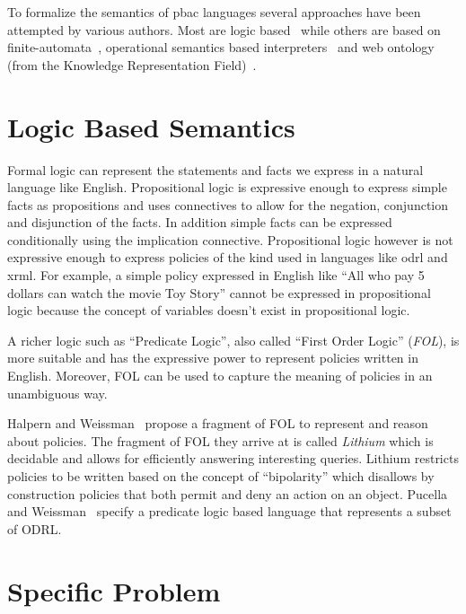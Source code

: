 To formalize the semantics of \ac{pbac} languages several approaches have been attempted by various authors. Most are logic based~\cite{Halpern2008, pucella2006} while others are based on finite-automata~\cite{Holzer}, operational semantics based interpreters~\cite{Safavi-naini} and web ontology (from the Knowledge Representation Field)~\cite{Kasten2010MTS}. 


\section{Logic Based Semantics}


Formal logic can represent the statements and facts we express in a natural language like English. Propositional logic is expressive enough to express simple facts as propositions and uses connectives to allow for the negation, conjunction and disjunction of the facts. In addition simple facts can be expressed conditionally using the implication connective. Propositional logic however is not expressive enough to express policies of the kind used in languages like \ac{odrl} and \ac{xrml}. For example, a simple policy expressed in English like ``All who pay 5 dollars can watch the movie Toy Story'' cannot be expressed in propositional logic because the concept of  variables doesn't exist in propositional logic. 

A richer logic such as ``Predicate Logic'', also called ``First Order Logic'' (\emph{FOL}), is more suitable and has the expressive power to represent policies written in English. Moreover, FOL can be used to capture the meaning of policies in an unambiguous way.

Halpern and Weissman~\cite{Halpern2008} propose a fragment of FOL to represent and reason about policies. The fragment of FOL they arrive at is called \emph{Lithium} which is decidable and allows for efficiently answering interesting queries. Lithium restricts policies to be written based on the concept of ``bipolarity'' which disallows by construction policies that both permit and deny an action on an object. Pucella and Weissman~\cite{pucella2006} specify a predicate logic based language that represents a subset of ODRL.


\section{Specific Problem}

